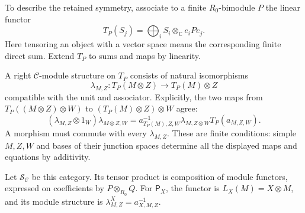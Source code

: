 To describe the retained symmetry, associate to a finite $R_0$-bimodule
$P$ the linear functor
\[
 T_P(S_j)=\bigoplus_i S_i\otimes_{\mathbb C}e_iPe_j.
\]
Here tensoring an object with a vector space means the corresponding
finite direct sum. Extend $T_P$ to sums and maps by linearity.

A right $\mathcal C$-module structure on $T_P$ consists of natural
isomorphisms
\[
 \lambda_{M,Z}:T_P(M\otimes Z)\longrightarrow T_P(M)\otimes Z
\]
compatible with the unit and associator. Explicitly, the two maps from
$T_P((M\otimes Z)\otimes W)$ to
$(T_P(M)\otimes Z)\otimes W$ agree:
\[
 (\lambda_{M,Z}\otimes1_W)\lambda_{M\otimes Z,W}
 =a^{-1}_{T_P(M),Z,W}\lambda_{M,Z\otimes W}T_P(a_{M,Z,W}).
\]
A morphism must commute with every $\lambda_{M,Z}$. These are finite
conditions: simple $M,Z,W$ and bases of their junction spaces determine
all the displayed maps and equations by additivity.

Let $\mathcal S_{\mathcal C}$ be this category. Its tensor product is
composition of module functors, expressed on coefficients by
$P\otimes_{R_0}Q$. For $\mathsf P_X$, the functor is
$L_X(M)=X\otimes M$, and its module structure is
$\lambda^X_{M,Z}=a^{-1}_{X,M,Z}$.

